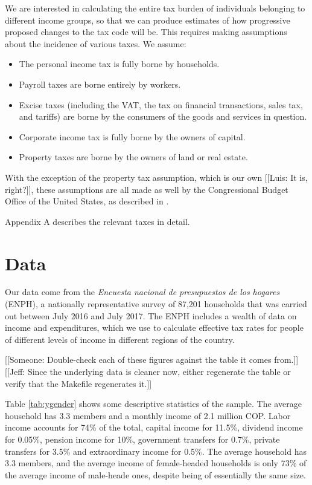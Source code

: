 \documentclass[12pt]{article}
\begin{document}
We are interested in calculating
the entire tax burden of individuals belonging to different income groups,
so that we can produce estimates of how progressive proposed changes to the tax code will be.
This requires making assumptions about the incidence of various taxes. We assume:

\begin{itemize}
  \item The personal income tax is fully borne by households.
  \item Payroll taxes are borne entirely by workers.
  \item Excise taxes
  (including the VAT, the tax on financial transactions, sales tax, and tariffs)
  are borne by the consumers of the goods and services in question.
  \item Corporate income tax is fully borne by the owners of capital.
  \item Property taxes are borne by
  the owners of land or real estate.
\end{itemize}

With the exception of the property tax assumption,
which is our own [[Luis: It is, right?]],
these assumptions are all made as well by
the Congressional Budget Office of the United States,
as described in \citet{salanie}.

Appendix A describes the relevant taxes in detail.

\section{Data}
Our data come from the
\textit{Encuesta nacional de presupuestos de los hogares} (ENPH),
a nationally representative survey of 87,201 households
that was carried out between July 2016 and July 2017.
The ENPH includes a wealth of data on income and expenditures,
which we use to calculate effective tax rates for
people of different levels of income in different regions of the country.


[[Someone:
    Double-check each of these figures
    against the table it comes from.]]
[[Jeff:
    Since the underlying data is cleaner now,
    either regenerate the table
    or verify that the Makefile regenerates it.]]

Table \ref{tab:ygender} shows some descriptive statistics of the sample.
The average household has 3.3 members and a monthly income of 2.1 million COP.
Labor income accounts for 74\% of the total,
capital income for 11.5\%,
dividend income for 0.05\%,
pension income for 10\%,
government transfers for 0.7\%,
private transfers for 3.5\%
and extraordinary income for 0.5\%.
The average household has 3.3 members,
and the average income of female-headed households
is only 73\% of the average income of male-heade ones,
despite being of essentially the same size.
\end{document}
